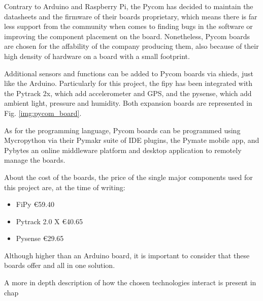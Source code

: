 		Contrary to Arduino and Raspberry Pi, the Pycom has decided to maintain the datasheets and the firmware of their boards proprietary, which means there is far less support from the community when comes to finding bugs in the software or improving the component placement on the board.
		Nonetheless, Pycom boards are chosen for the affability of the company producing them, also because of their high density of hardware on a board with a small footprint.
		
		Additional sensors and functions can be added to Pycom boards via shieds, just like the Arduino.
		Particularly for this project, the fipy has been integrated with the Pytrack 2x, which add accelerometer and GPS, and the pysense, which add ambient light, pressure and humidity.
		Both expansion boards are represented in Fig. \ref{img:pycom_board}.
				
		As for the programming language, Pycom boards can be programmed using Mycropython via their Pymakr suite of IDE plugins, the Pymate mobile app, and Pybytes an online middleware platform and desktop application to remotely manage the boards.
		
		About the cost of the boards, the price of the single major components used for this project are, at the time of writing:
		\begin{itemize}
			\item FiPy €59.40
			\item Pytrack 2.0 X €40.65
			\item Pysense €29.65
		\end{itemize}
		
		Although higher than an Arduino board, it is important to consider that these boards offer and all in one solution.		
		
		A more in depth description of how the chosen technologies interact is present in chap
		